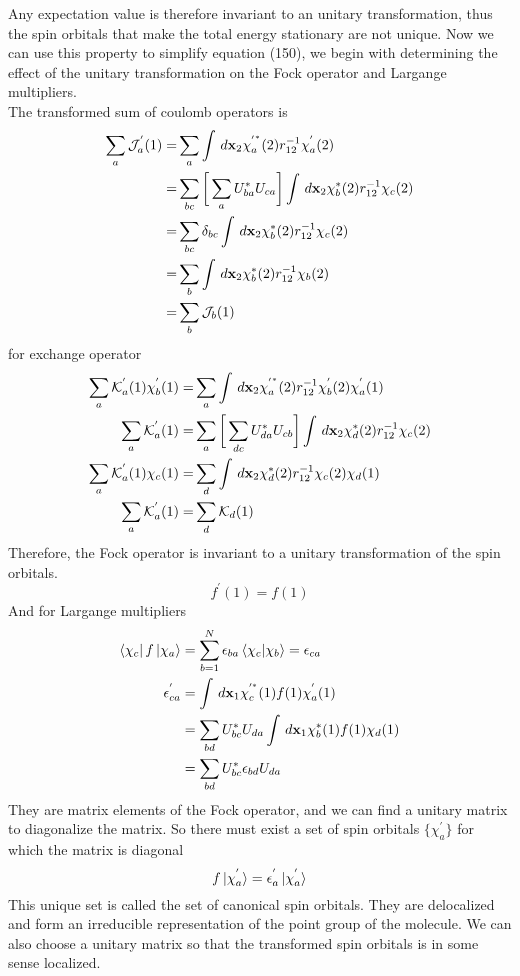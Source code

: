 \documentclass[11pt]{article}
\begin{document}
Any expectation value is therefore invariant to an unitary transformation, thus the spin orbitals that make the
total energy stationary are not unique. Now we can use this property to simplify equation (150), we begin with
determining the effect of the unitary transformation on the Fock operator and Largange multipliers.\\
The transformed sum of coulomb operators is
\begin{align}
    \sum_{a}\mathcal{J}_a^{'}(1)=&\sum_{a}\int\,d\mathbf{x}_2\chi_a^{{'}^*}(2)r_{12}^{-1}\chi_a^{'}(2)\notag \\
    =&\sum_{bc}\bigg[\sum_{a}U_{ba}^*U_{ca}\bigg]\int\,d\mathbf{x}_2\chi_b^*(2)r_{12}^{-1}\chi_c(2)\notag \\
    =&\sum_{bc}\delta_{bc}\int\,d\mathbf{x}_2\chi_b^*(2)r_{12}^{-1}\chi_c(2)\notag \\
    =&\sum_{b}\int\,d\mathbf{x}_2\chi_b^*(2)r_{12}^{-1}\chi_b(2)\notag \\
    =&\sum_{b}\mathcal{J}_b(1)
\end{align}
for exchange operator
\begin{align}
    \sum_{a}\mathcal{K}_a^{'}(1)\chi_b^{'}(1)=&\sum_{a}\int\,d\mathbf{x}_2\chi_a^{{'}^*}(2)r_{12}^{-1}\chi_b^{'}(2) \chi_a^{'}(1)\notag \\
    \sum_{a}\mathcal{K}_a^{'}(1)=&\sum_{a}\bigg[\sum_{dc}U_{da}^*U_{cb}\bigg]\int\,d\mathbf{x}_2\chi_d^*(2)r_{12}^{-1}\chi_c(2) \notag \\
    \sum_{a}\mathcal{K}_a^{'}(1)\chi_c(1)=&\sum_{d}\int\,d\mathbf{x}_2\chi_d^*(2)r_{12}^{-1}\chi_c(2)\chi_d(1)\notag \\
    \sum_{a}\mathcal{K}_a^{'}(1)=&\sum_{d}\mathcal{K}_d(1)
\end{align}
Therefore, the Fock operator is invariant to a unitary transformation of the spin orbitals.
\begin{equation}
    f^{'}(1)=f(1)
\end{equation}
And for Largange multipliers
\begin{align}
    \bra{\chi_c}f\ket{\chi_a}&=\sum_{b=1}^{N}\epsilon_{ba}\braket{\chi_c|\chi_b}=\epsilon_{ca} \notag \\
    \epsilon_{ca}^{'}&=\int\,d\mathbf{x}_1\chi_c^{'^{*}}(1)f(1)\chi_a^{'}(1) \notag \\
    &=\sum_{bd}U_{bc}^*U_{da}\int\,d\mathbf{x}_1\chi_b^*(1)f(1)\chi_d(1) \notag \\
    &=\sum_{bd}U_{bc}^* \epsilon_{bd} U_{da}
\end{align}
They are matrix elements of the Fock operator, and we can find a unitary matrix to diagonalize the matrix. So there
must exist a set of spin orbitals $\{\chi_a^{'}\}$ for which the matrix is diagonal
\begin{equation}
    f\ket{\chi_a^{'}}=\epsilon_a^{'}\ket{\chi_a^{'}}
\end{equation}
This unique set is called the set of canonical spin orbitals. They are delocalized and form an irreducible representation
of the point group of the molecule. We can also choose a unitary matrix so that the transformed spin orbitals is in some
sense localized.
\end{document}
